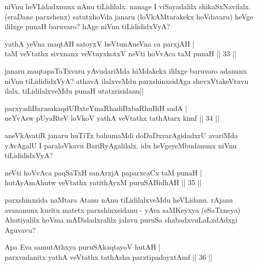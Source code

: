 \begin{artha}
niVnu heVLidadxnunx nAnu tiLidilalx. nanage I viSayadalilx 
shikaSxNavilalx. (eraDane parxshenx) satutxhoVda janaru 
(loVkAMtarakekx hoVdavaru) heVge ililxge punaH baruvaro? hAge niVnu 
tiLidididxVyA? 
\end{artha}


\begin{shl}
yathA yeVna maqtAH satoyxV heVtunA\s neVna ca parxjAH | \\
taM veVtathx sivxnanx veVtuyxkotxV neVti hoVvAca taM punaH \hfill|| 33 || 
\end{shl}

\begin{artha}
janaru maqtapaTaTxvaru yAvudariMda hiMdakekx ililxge baruvaro adanunx 
niVnu tiLidididxVyA? athavA ilalxveMdu parxshinxsidAga shevxVtakeVtuvu 
ilalx, tiLidilalxveMdu punaH utatxrisidanu||
\end{artha}


\begin{shl}
parxyadiBxrasakaqdUBxteYmaRhadiBxbaRhuBiH sadA | \\
neYvAsw pUyaRteV loVkoV yathA veVtathx tathA\s tarx kimf \hfill|| 34 || 
\end{shl}

\begin{artha}
aneVkAvatiR janaru huTiTx bahumaMdi doDaDxvarAgidadxrU avariMda 
yAvAgalU I paraloVkavu BariRyAgalilalx. idu heVgeyeMbudanunx niVnu 
tiLidididxVyA?
\end{artha}


\begin{shl}
neVti hoVvAca paqSaTxH sanArxjA paparxcaCx taM punaH | \\
hutAyAmAhutw veVtathx yatithAyxM puruSABidhAH \hfill|| 35 || 
\end{shl}

\begin{artha}
parxshinxsida naMtara Atanu nAnu tiLidilalxveMdu heVLidanu. rAjanu 
avananunx kuritu matetx parxshinxsidanu - yAva saMKeyxya (eSaTxneya) 
Ahutiyalilx hoVma mADidadxralilx jalavu puruSa shabadxvuLaLxdAdxgi 
Aguvavu?
\end{artha}


\begin{shl}
Apa Eva samutAthxya puruSAkaqtayoV hutAH | \\
parxvadanitx yathA veVtathx tathA\s \s shu parxtipadayxtAmf \hfill|| 36 || 
\end{shl}

